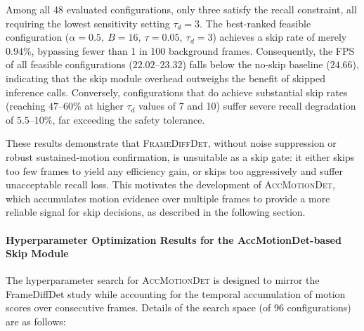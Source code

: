 \documentclass[
  10pt,
]{article}
\begin{document}
Among all 48 evaluated configurations, only three satisfy the recall
constraint, all requiring the lowest sensitivity setting \(\tau_d = 3\).
The best-ranked feasible configuration
(\(\alpha{=}0.5,\ B{=}16,\ \tau{=}0.05,\ \tau_d{=}3\)) achieves a skip
rate of merely \(0.94\%\), bypassing fewer than 1 in 100 background
frames. Consequently, the FPS of all feasible configurations
(\(22.02\)--\(23.32\)) falls below the no-skip baseline (\(24.66\)),
indicating that the skip module overhead outweighs the benefit of
skipped inference calls. Conversely, configurations that do achieve
substantial skip rates (reaching \(47\)--\(60\%\) at higher \(\tau_d\)
values of 7 and 10) suffer severe recall degradation of
\(5.5\)--\(10\%\), far exceeding the safety tolerance.

These results demonstrate that \textsc{FrameDiffDet}, without noise
suppression or robust sustained-motion confirmation, is unsuitable as a
skip gate: it either skips too few frames to yield any efficiency gain,
or skips too aggressively and suffer unacceptable recall loss. This
motivates the development of \textsc{AccMotionDet}, which accumulates
motion evidence over multiple frames to provide a more reliable signal
for skip decisions, as described in the following section.

\paragraph{Hyperparameter Optimization Results for the
AccMotionDet-based Skip Module}\label{sec:accMotionResults}



The hyperparameter search for \textsc{AccMotionDet} is designed to
mirror the FrameDiffDet study while accounting for the temporal
accumulation of motion scores over consecutive frames. Details of the
search space (of 96 configurations) are as follows:
\end{document}
